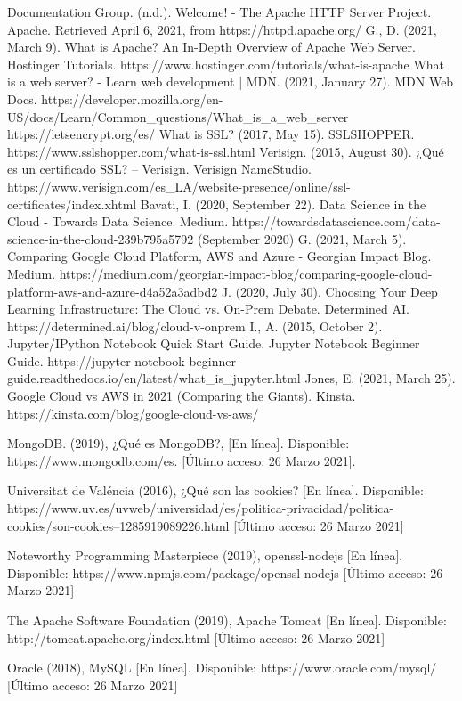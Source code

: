 \documentclass[12pt, a4paper, titlepage]{report}
\begin{document}
\begin{thebibliography}{20}
	Documentation Group. (n.d.). Welcome! - The Apache HTTP Server Project. Apache. Retrieved April 6, 2021, from https://httpd.apache.org/
	G., D. (2021, March 9). What is Apache? An In-Depth Overview of Apache Web Server. Hostinger Tutorials. https://www.hostinger.com/tutorials/what-is-apache
	What is a web server? - Learn web development | MDN. (2021, January 27). MDN Web Docs. https://developer.mozilla.org/en-US/docs/Learn/Common\_questions/What\_is\_a\_web\_server
	https://letsencrypt.org/es/
	What is SSL? (2017, May 15). SSLSHOPPER. https://www.sslshopper.com/what-is-ssl.html
	Verisign. (2015, August 30). ¿Qué es un certificado SSL? – Verisign. Verisign NameStudio. https://www.verisign.com/es\_LA/website-presence/online/ssl-certificates/index.xhtml
	Bavati, I. (2020, September 22). Data Science in the Cloud - Towards Data Science. Medium. https://towardsdatascience.com/data-science-in-the-cloud-239b795a5792 (September 2020)
	G. (2021, March 5). Comparing Google Cloud Platform, AWS and Azure - Georgian Impact Blog. Medium. https://medium.com/georgian-impact-blog/comparing-google-cloud-platform-aws-and-azure-d4a52a3adbd2
	J. (2020, July 30). Choosing Your Deep Learning Infrastructure: The Cloud vs. On-Prem Debate. Determined AI. https://determined.ai/blog/cloud-v-onprem
	I., A. (2015, October 2). Jupyter/IPython Notebook Quick Start Guide. Jupyter Notebook Beginner Guide. https://jupyter-notebook-beginner-guide.readthedocs.io/en/latest/what\_is\_jupyter.html
	Jones, E. (2021, March 25). Google Cloud vs AWS in 2021 (Comparing the Giants). Kinsta. https://kinsta.com/blog/google-cloud-vs-aws/
	
	
	
	
	MongoDB. (2019), ¿Qué es MongoDB?, [En línea]. Disponible: https://www.mongodb.com/es. [Último acceso: 26 Marzo 2021].
	
	Universitat de Valéncia (2016), ¿Qué son las cookies? [En línea]. Disponible:           https://www.uv.es/uvweb/universidad/es/politica-privacidad/politica-cookies/son-cookies--1285919089226.html [Último acceso: 26 Marzo 2021]
	
	Noteworthy Programming Masterpiece (2019), openssl-nodejs [En línea]. Disponible: https://www.npmjs.com/package/openssl-nodejs [Último acceso: 26 Marzo 2021]
	
	The Apache Software Foundation (2019), Apache Tomcat [En línea]. Disponible: http://tomcat.apache.org/index.html [Último acceso: 26 Marzo 2021]
	
	Oracle (2018), MySQL [En línea]. Disponible: https://www.oracle.com/mysql/ [Último acceso: 26 Marzo 2021]
	
\end{thebibliography}	
\end{document}
